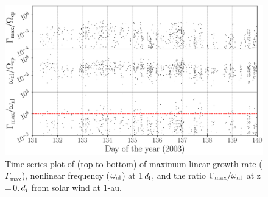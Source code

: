         \begin{figure}
            \begin{center}
                \includegraphics[width=1.\textwidth]{figures/chap7/wnd_gamma_omega_ratio_2003-5-11_2003-5-19_01207878_01212368.pdf}
                \caption[Comparison plot of $\Gamma_{\max}$, $\omega_{\rm nl}$ and
                $\Gamma_{\max}/\omega_{\rm nl}$ for \texttt{wnd} dataset]{Time series plot of (top
                to bottom) of maximum linear growth rate ($\Gamma_{\max}$), nonlinear frequency
                ($\omega_{\rm nl}$) at 1\,$d_{\rm i}$, and the ratio $\Gamma_{\max}/\omega_{\rm nl}$
                at z\,=\,0.\,$d_{\rm i}$ from solar wind at 1-au.}
                \label{fig:ratio_wnd}
            \end{center}
        \end{figure}


